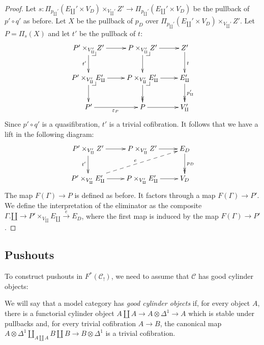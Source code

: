 \documentclass[reqno]{amsart}
\makeatletter
\theoremstyle{definition}
\theoremstyle{remark}
\newcommand{\scat}[1]{\mathcal{#1}}
\numberwithin{figure}{section}
\newcommand{\pb}[1][dr]{\save*!/#1-1.2pc/#1:(-1,1)@^{|-}\restore}
\makeatother
\begin{document}
\begin{proof}
Let $s : \Pi_{p_\amalg'}(E_\amalg' \times V_D) \times_{V_\amalg'} Z' \to \Pi_{p_\amalg'}(E_\amalg' \times V_D)$ be the pullback of $p' \circ q'$ as before.
Let $X$ be the pullback of $p_D$ over $\Pi_{p_\amalg'}(E_\amalg' \times V_D) \times_{V_\amalg'} Z'$.
Let $P = \Pi_s(X)$ and let $t'$ be the pullback of $t$:
\[ \xymatrix{ P' \times_{V_\amalg'} Z' \ar[r] \ar[d]_{t'} \pb   & P \times_{V_\amalg'} Z' \ar[r] \ar[d] \pb                 & Z' \ar[d]^t                           \\
              P' \times_{V_\amalg'} E_\amalg' \ar[r] \ar[d] \pb & P \times_{V_\amalg'} E_\amalg' \ar[r] \ar@{->>}[d] \pb    & E_\amalg' \ar@{->>}[d]^{p_\amalg'}    \\
              P' \ar[r]_{\varepsilon_P}                         & P \ar[r]                                                  & V_\amalg'
            } \]
Since $p' \circ q'$ is a quasifibration, $t'$ is a trivial cofibration.
It follows that we have a lift in the following diagram:
\[ \xymatrix{ P' \times_{V_\amalg'} Z' \ar[r] \ar[d]_{t'}               & P \times_{V_\amalg'} Z' \ar[r]        & E_D \ar@{->>}[d]^{p_D} \\
              P' \times_{V_\amalg'} E_\amalg' \ar[r] \ar@{-->}[urr]^e   & P \times_{V_\amalg'} E_\amalg' \ar[r] & V_D
            } \]
The map $F(\Gamma) \to P$ is defined as before.
It factors through a map $F(\Gamma) \to P'$.
We define the interpretation of the eliminator as the composite $\Gamma.\amalg \to P' \times_{V_\amalg} E_\amalg \xrightarrow{e} E_D$, where the first map is induced by the map $F(\Gamma) \to P'$.
\end{proof}

\subsection{Pushouts}

To construct pushouts in $F^*(\scat{C}_!)$, we need to assume that $\scat{C}$ has good cylinder objects:

\begin{defn}
We will say that a model category has \emph{good cylinder objects} if, for every object $A$, there is a functorial cylinder object $A \amalg A \to A \otimes \Delta^1 \to A$ which is stable under pullbacks and,
for every trivial cofibration $A \to B$, the canonical map $A \otimes \Delta^1 \amalg_{A \amalg A} B \amalg B \to B \otimes \Delta^1$ is a trivial cofibration.
\end{defn}
\end{document}
